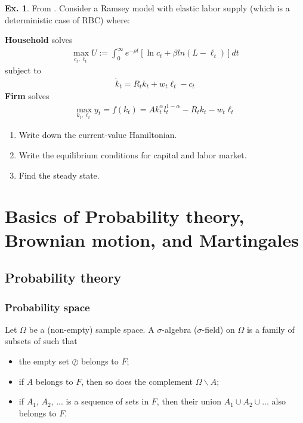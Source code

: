 \documentclass[11pt,a4paper]{book}
\theoremstyle{definition}\newtheorem{definition}{Definition}
\theoremstyle{definition}\newtheorem{fact}{Fact}
\theoremstyle{definition}\newtheorem{remark}{Remark}
\theoremstyle{definition}\newtheorem{ex}{Ex.}
\theoremstyle{definition}\newtheorem{project}{Project}
\theoremstyle{definition}\newtheorem{problem}{Problem}
\theoremstyle{definition}\newtheorem{example}{Example}
\numberwithin{theorem}{section}
\numberwithin{corollary}{chapter}
\numberwithin{assumption}{chapter}
\numberwithin{definition}{chapter}
\numberwithin{prop}{chapter}
\numberwithin{notation}{chapter}
\numberwithin{problem}{chapter}
\numberwithin{example}{chapter}
\numberwithin{fact}{chapter}
\numberwithin{ex}{chapter}
\begin{document}
	\begin{ex}
		From \citet[Ch. 4]{chu2021advanced}. Consider a Ramsey model with elastic labor supply (which is a deterministic case of RBC) where:
		
		\textbf{Household} solves
		\begin{align*}
			\max_{c_t, \ell_t} U:= \int^{\infty}_0 e^{-\rho t} [ \ln c_t + \beta ln (L - \ell_t) ] dt
		\end{align*}
		subject to
		\begin{align*}
			\dot{k}_t = R_t k_t + w_t \ell_t - c_t 
		\end{align*}
		\textbf{Firm} solves
		\begin{align*}
			\max_{k_t, \ell_t} y_t = f(k_t) = A k_t^\alpha l_t^{1-\alpha} - R_t k_t - w_t \ell_t
		\end{align*}
		\begin{enumerate}
					\item Write down the current-value Hamiltonian.
				\item Write the equilibrium conditions for capital and labor market.
		\item Find the steady state.
		\end{enumerate}
	\end{ex}
		
\chapter{Basics of Probability theory, Brownian motion, and Martingales}

\section{Probability theory}

\subsection{Probability space}
Let $\Omega$ be a (non-empty) sample space. A $\sigma$-algebra ($\sigma$-field) on $\Omega$ is a family of subsets of such that
\begin{itemize}
\item the empty set $\oslash$ belongs to $F$;
\item if $A$ belongs to $F$, then so does the complement $\Omega \backslash A$;
\item if $A_1$, $A_2$, ... is a sequence of sets in $F$, then their union $A_1 \cup A_2 \cup ...$ also belongs to $F$.
\end{itemize}
\end{document}
